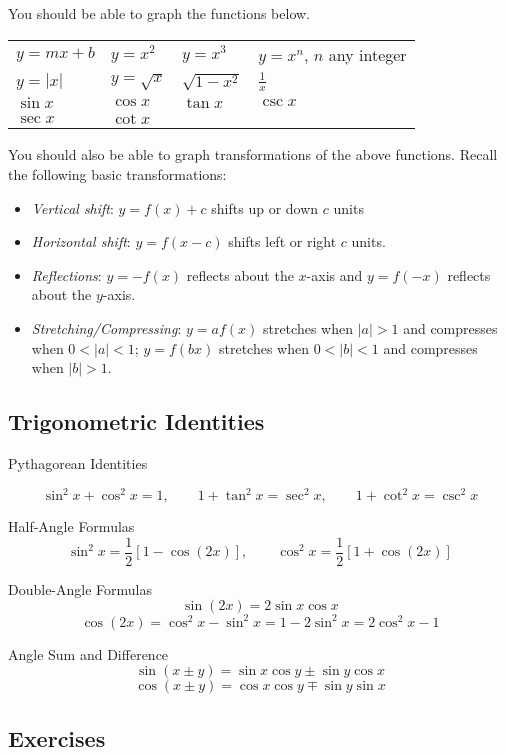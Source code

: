 You should be able to graph the functions below.
\vspace{-6pt}
\begin{center}
	\def\arraystretch{1.5}
    \begin{tabular}{ p{3cm} p{3cm} p{3cm} p{6cm} }
        $y = mx + b$ & $y = x^2$ & $y = x^3$ & $y=x^n$, $n$ any integer \\
        $y = |x|$ & $y=\sqrt{x}$ & $\sqrt{1 - x^2}$ & $\frac{1}{x}$\\
        $\sin x$ & $\cos x$ & $\tan x$ & $\csc x$ \\
        $\sec x$ & $\cot x$ 
    \end{tabular}
\end{center}

You should also be able to graph transformations of the above functions. Recall the following basic transformations:
\begin{itemize}
	\item \emph{Vertical shift}: $y = f(x) + c$ shifts up or down $c$ units
    \item \emph{Horizontal shift}: $y = f (x - c)$ shifts left or right $c$ units.
    \item \emph{Reflections}: $y = −f(x)$ reflects about the $x$-axis and $y = f(−x)$ reflects about the $y$-axis. 
    \item \emph{Stretching/Compressing}: $y = af(x)$ stretches when $|a| > 1$ and compresses when $0 < |a| < 1$; $y = f(bx)$ stretches when $0 < |b| < 1$ and compresses when $|b| > 1$.
\end{itemize}

\newpage
\subsection*{Trigonometric Identities}

Pythagorean Identities

$$\sin^2 x + \cos^2 x = 1, \qquad 1 + \tan^2 x = \sec^2 x, \qquad 1 + \cot^2 x = \csc^2 x$$

Half-Angle Formulas
$$\sin^2 x = \frac{1}{2}[1 - \cos(2x)] , \qquad \cos^2 x = \frac{1}{2} [1 + \cos(2x)] $$

Double-Angle Formulas
$$\sin(2x) = 2 \sin x \cos x $$ $$ \cos(2x) =\cos^2 x - \sin^2 x = 1 - 2 \sin^2 x
= 2 \cos^2 x - 1$$

Angle Sum and Difference
$$\sin (x \pm y) = \sin x \cos y \pm \sin y \cos x $$ 
$$\cos (x \pm y) = \cos x \cos y \mp \sin y \sin x $$

\subsection*{Exercises}

